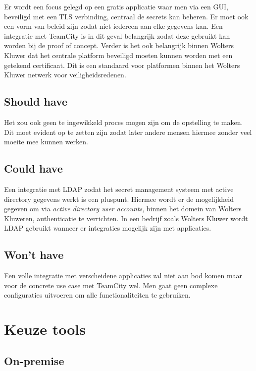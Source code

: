Er wordt een focus gelegd op een gratis applicatie waar men via een GUI, beveiligd met een TLS verbinding, centraal de secrets kan beheren. Er moet ook een vorm van beleid zijn zodat niet iedereen aan elke gegevens kan. Een integratie met TeamCity is in dit geval belangrijk zodat deze gebruikt kan worden bij de proof of concept. Verder is het ook belangrijk binnen Wolters Kluwer dat het centrale platform beveiligd moeten kunnen worden met een getekend certificaat. Dit is een standaard voor platformen binnen het Wolters Kluwer netwerk voor veiligheidsredenen.

\subsection{Should have}

Het zou ook geen te ingewikkeld proces mogen zijn om de opstelling te maken. Dit moet evident op te zetten zijn zodat later andere mensen hiermee zonder veel moeite mee kunnen werken.

\subsection{Could have}

Een integratie met LDAP zodat het secret management systeem met active directory gegevens werkt is een pluspunt. Hiermee wordt er de mogelijkheid gegeven om via \textit{active directory user accounts}, binnen het domein van Wolters Kluweren, authenticatie te verrichten. In een bedrijf zoals Wolters Kluwer wordt LDAP gebruikt wanneer er integraties mogelijk zijn met applicaties. 

\subsection{Won't have}

Een volle integratie met verscheidene applicaties zal niet aan bod komen maar voor de concrete use case met TeamCity wel. Men gaat geen complexe configuraties uitvoeren om alle functionaliteiten te gebruiken.

\section{Keuze tools}

\subsection{On-premise}


